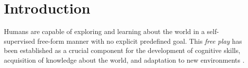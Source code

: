 \chapter{Introduction}
\label{sec:introduction}

Humans are capable of exploring and learning about the world in a self-supervised free-form manner with no explicit predefined goal.
This \emph{free play} has been established as a crucial component for the development of cognitive skills, acquisition of knowledge about the world, and adaptation to new environments \citep{exploration,chu2020play,playreview}.






